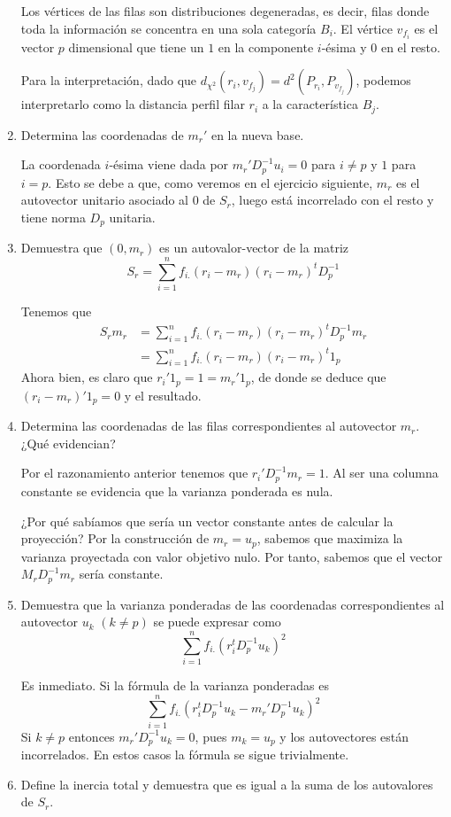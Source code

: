 \documentclass[twoside]{article}
\begin{document}
\begin{enumerate}
Los vértices de las filas son distribuciones degeneradas, es decir, filas donde toda la información se concentra en una sola categoría $B_i$. El vértice $v_{f_i}$ es el vector $p$ dimensional que tiene un $1$ en la componente $i$-ésima y $0$ en el resto.

Para la interpretación, dado que $d_{\chi^2}(r_i,v_{f_j})= d^2(P_{r_i},P_{v_{f_j}})$, podemos interpretarlo como la distancia perfil filar $r_i$ a la característica $B_j$.

\item Determina las coordenadas de $m_r'$ en la nueva base. 

La coordenada $i$-ésima viene dada por $m_r' D_p^{-1} u_i=0$ para $i\neq p$ y $1$ para $i=p$. Esto se debe a que, como veremos en el ejercicio siguiente, $m_r$ es el autovector unitario asociado al $0$ de $S_r$, luego está incorrelado con el resto y tiene norma $D_p$ unitaria.
\item Demuestra que $(0, m_r)$ es un autovalor-vector de la matriz
\[ S_r = \sum_{i=1}^n f_{i.} (r_i - m_r) (r_i - m_r)^t D_p^{-1} \]

Tenemos que
\begin{align*}
S_rm_r &= \sum_{i=1}^n f_{i.} (r_i - m_r) (r_i - m_r)^t D_p^{-1} m_r\\
& = \sum_{i=1}^n f_{i.} (r_i - m_r) (r_i - m_r)^t 1_p
\end{align*}
Ahora bien, es claro que $r_i' 1_p = 1 = m_r' 1_p$, de donde se deduce que $(r_i-m_r)'1_p = 0$ y el resultado.

\item Determina las coordenadas de las filas correspondientes al autovector $m_r$. ¿Qué evidencian?

Por el razonamiento anterior tenemos que $r_i' D_p^{-1} m_r = 1$. Al ser una columna constante se evidencia que la varianza ponderada es nula.

¿Por qué sabíamos que sería un vector constante antes de calcular la proyección? Por la construcción de $m_r = u_p$, sabemos que maximiza la varianza proyectada con valor objetivo nulo. Por tanto, sabemos que el vector $M_rD_p^{-1} m_r$ sería constante.

\item Demuestra que la varianza ponderadas de las coordenadas correspondientes al autovector $u_k$ $(k\neq p)$ se puede expresar como
\[ \sum_{i=1}^n f_{i.} (r_i^t D_p^{-1} u_k)^2 \]

Es inmediato. Si la fórmula de la varianza ponderadas es
$$
\sum_{i=1}^n f_{i.} (r_i^t D_p^{-1} u_k-m_r'D_p^{-1}u_k)^2
$$
Si $k\neq p$ entonces $m_r'D_p^{-1}u_k=0$, pues $m_k = u_p$ y los autovectores están incorrelados. En estos casos la fórmula se sigue trivialmente.
\item Define la inercia total y demuestra que es igual a la suma de los autovalores de $S_r$.


\end{enumerate}
\end{document}
